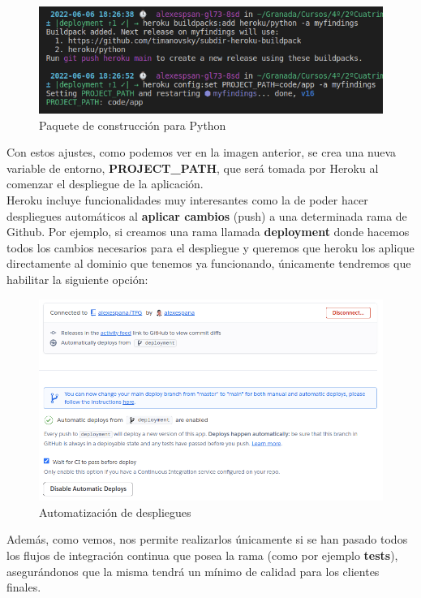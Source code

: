     \begin{figure}[H]
        \centering
        \includegraphics[scale=0.55]{imagenes/second-buildpack.png}
        \caption{Paquete de construcción para Python}
        \label{fig:heroku-buildpack-python}
    \end{figure}

Con estos ajustes, como podemos ver en la imagen anterior, se crea una nueva variable de
entorno, \textbf{PROJECT\_PATH}, que será tomada por Heroku al comenzar el despliegue de
la aplicación.\\

Heroku incluye funcionalidades muy interesantes como la de poder hacer despliegues
automáticos al \textbf{aplicar cambios} (push) a una determinada rama de Github. Por
ejemplo, si creamos una rama llamada \textbf{deployment} donde hacemos todos los cambios
necesarios para el despliegue y queremos que heroku los aplique directamente al dominio
que tenemos ya funcionando, únicamente tendremos que habilitar la siguiente opción:

    \begin{figure}[H]
        \centering
        \includegraphics[scale=0.44]{imagenes/autodeploy.png}
        \caption{Automatización de despliegues}
        \label{fig:autodeploy}
    \end{figure}

Además, como vemos, nos permite realizarlos únicamente si se han pasado todos los flujos
de integración continua que posea la rama (como por ejemplo \textbf{tests}), asegurándonos
que la misma tendrá un mínimo de calidad para los clientes finales.\\

